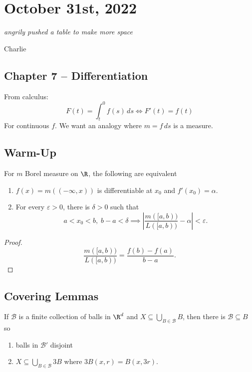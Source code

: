 \section{October 31st, 2022}

\epigraph{\textit{angrily pushed a table to make more space}}{Charlie}

\subsection{Chapter 7 -- Differentiation}

From calculus:
\[
  F(t) = \int_{t}^{0} f(s) \,ds \iff F'(t) = f(t)
\]
For continuous $f$. We want an analogy where $m = f \,ds$ is a measure.

\subsection*{Warm-Up}

\begin{theorem}
  For $m$ Borel measure on $\R$, the following are equivalent
  \begin{enumerate}
    \item $f(x) = m((-\infty, x))$ is differentiable at $x_0$ and $f'(x_0) = \alpha$.
    \item For every $\varepsilon > 0$, there is $\delta > 0$ such that
      \[
      a < x_0 < b, \; b - a < \delta \implies \left| \frac{m([a,b))}{L([a,b))} - \alpha \right| < \varepsilon.
      \]
  \end{enumerate}
\end{theorem}

\begin{proof}
  \[
    \frac{m([a,b))}{L([a,b))} = \frac{f(b) - f(a)}{b-a}.
  \]
\end{proof}

\subsection{Covering Lemmas}

\begin{lemma}
  If $\mathcal{B}$ is a finite collection of balls in $\R^d$ and $X \subseteq \bigcup_{B \in \mathcal{B}} B$, then there is $\mathcal{B} \subseteq B$ so
  \begin{enumerate}
    \item balls in $\mathcal{B}'$ disjoint \label{lma:1}
    \item $X \subseteq \bigcup_{B \in \mathcal{B}} 3B$ where $3B(x,r) = B(x, 3r)$. \label{lma:2}
  \end{enumerate}
\end{lemma}

